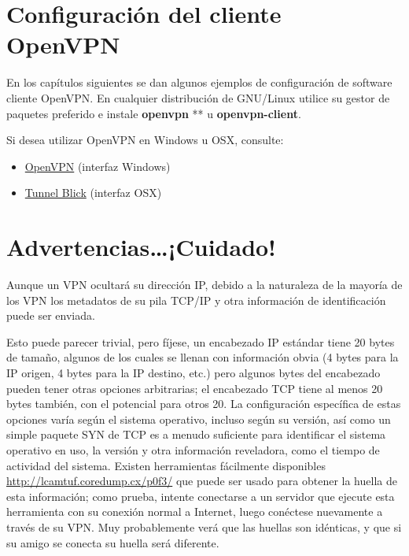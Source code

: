 \documentclass[10pt,a5paper,twoside,,]{book}
\providecommand{\tightlist}{%
  \setlength{\itemsep}{0pt}\setlength{\parskip}{0pt}}
\begin{document}
\section{Configuración del cliente
OpenVPN}\label{configuraciuxf3n-del-cliente-openvpn}

En los capítulos siguientes se dan algunos ejemplos de configuración de
software cliente OpenVPN. En cualquier distribución de GNU/Linux utilice
su gestor de paquetes preferido e instale \textbf{openvpn} ** u
\textbf{openvpn-client}.

Si desea utilizar OpenVPN en Windows u OSX, consulte:

\begin{itemize}
\tightlist
\item
  \href{http://openvpn.se}{OpenVPN} (interfaz Windows)
\item
  \href{http://code.google.com/p/tunnelblick}{Tunnel Blick} (interfaz
  OSX)
\end{itemize}

\section{Advertencias\ldots{}¡Cuidado!}\label{advertenciascuidado}

Aunque un VPN ocultará su dirección IP, debido a la naturaleza de la
mayoría de los VPN los metadatos de su pila TCP/IP y otra información de
identificación puede ser enviada.

Esto puede parecer trivial, pero fíjese, un encabezado IP estándar tiene
20 bytes de tamaño, algunos de los cuales se llenan con información
obvia (4 bytes para la IP origen, 4 bytes para la IP destino, etc.) pero
algunos bytes del encabezado pueden tener otras opciones arbitrarias; el
encabezado TCP tiene al menos 20 bytes también, con el potencial para
otros 20. La configuración específica de estas opciones varía según el
sistema operativo, incluso según su versión, así como un simple paquete
SYN de TCP es a menudo suficiente para identificar el sistema operativo
en uso, la versión y otra información reveladora, como el tiempo de
actividad del sistema. Existen herramientas fácilmente disponibles
\url{http://lcamtuf.coredump.cx/p0f3/} que puede ser usado para obtener
la huella de esta información; como prueba, intente conectarse a un
servidor que ejecute esta herramienta con su conexión normal a Internet,
luego conéctese nuevamente a través de su VPN. Muy probablemente verá
que las huellas son idénticas, y que si su amigo se conecta su huella
será diferente.
\end{document}
